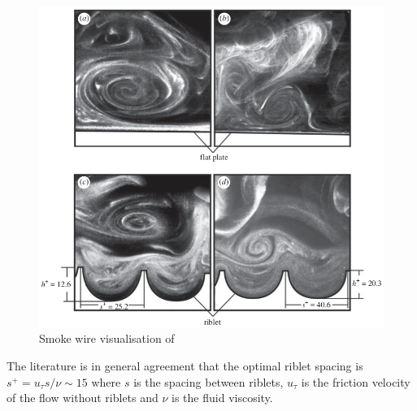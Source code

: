 \documentclass[12pt,oneside,a4paper]{article}
\begin{document}
\begin{figure}[!t]
\centering
\includegraphics[width=12cm]{images/smokeWireVisualisation.png}
\caption{Smoke wire visualisation of \cite{lee2001}}
\label{figure:literatureReview:smokeWireVisualisation}
\end{figure}
 
 
 
 
  The literature is in general agreement that the optimal riblet spacing is $s^+ =  u_\tau s/\nu \sim 15$ where $s$ is the spacing between riblets, $u_\tau$ is the friction velocity of the flow without riblets and $\nu$ is the fluid viscosity.
\end{document}
